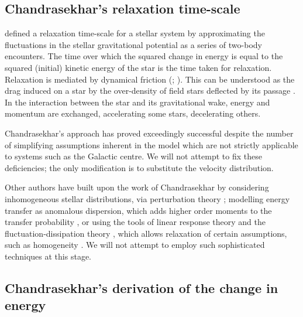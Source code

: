 \documentclass[useAMS,usedcolumn,usegraphicx,usenatbib]{mn2e}
\begin{document}
\begin{onecolumn}

\section{Chandrasekhar's relaxation time-scale}\label{sec:time-scale}

\citet[chapter 2]{Chandrasekhar1960} defined a relaxation time-scale for a stellar system by approximating the fluctuations in the stellar gravitational potential as a series of two-body encounters. The time over which the squared change in energy is equal to the squared (initial) kinetic energy of the star is the time taken for relaxation. Relaxation is mediated by dynamical friction (\citealt{Chandrasekhar1943a}; \citealt[section 1.2]{Binney2008}). This can be understood as the drag induced on a star by the over-density of field stars deflected by its passage \citep{Mulder1983}. In the interaction between the star and its gravitational wake, energy and momentum are exchanged, accelerating some stars, decelerating others.

Chandrasekhar's approach has proved exceedingly successful despite the number of simplifying assumptions inherent in the model which are not strictly applicable to systems such as the Galactic centre. We will not attempt to fix these deficiencies; the only modification is to substitute the velocity distribution.

Other authors have built upon the work of Chandrasekhar by considering inhomogeneous stellar distributions, via perturbation theory \citep{Lynden-Bell1972,Tremaine1984,Weinberg1986}; modelling energy transfer as anomalous dispersion, which adds higher order moments to the transfer probability \citep{Bar-Or2012}, or using the tools of linear response theory and the fluctuation-dissipation theory \citep[chapter 7]{Landau1958}, which allows relaxation of certain assumptions, such as homogeneity \citep{Bekenstein1992,Maoz1993,Nelson1999}. We will not attempt to employ such sophisticated techniques at this stage.

\subsection{Chandrasekhar's derivation of the change in energy}\label{sec:Chandra}


\end{onecolumn}
\end{document}
